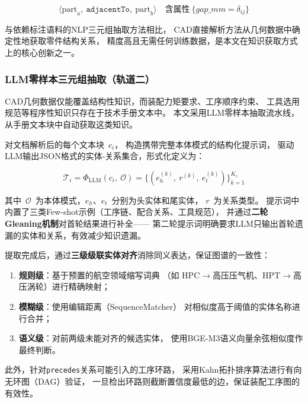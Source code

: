 \begin{equation}
  \langle \text{part}_a,\ \texttt{adjacentTo},\ \text{part}_b \rangle
  \quad \text{含属性}\ \{gap\_mm = \delta_{ij}\}
  \label{eq:adjacent}
\end{equation}

与依赖标注语料的NLP三元组抽取方法相比，
CAD直接解析方法从几何数据中确定性地获取零件结构关系，
精度高且无需任何训练数据，是本文在知识获取方式上的核心创新之一。

\subsubsection{LLM零样本三元组抽取（轨道二）}
\label{sec:llm-kg}

CAD几何数据仅能覆盖结构性知识，而装配力矩要求、工序顺序约束、
工具选用规范等程序性知识只存在于技术手册文本中。
本文采用LLM零样本抽取流水线，从手册文本块中自动获取这类知识。

对文档解析后的每个文本块~$c_i$，
构造携带完整本体模式的结构化提示词，
驱动LLM输出JSON格式的实体-关系集合，形式化定义为：

\begin{equation}
  \mathcal{T}_i = \Phi_{\text{LLM}}(c_i,\ \mathcal{O})
                = \bigl\{(e_h^{(k)},\ r^{(k)},\ e_t^{(k)})\bigr\}_{k=1}^{K_i}
  \label{eq:llm-extract}
\end{equation}

其中~$\mathcal{O}$~为本体模式，$e_h$、$e_t$~分别为头实体和尾实体，
$r$~为关系类型。
提示词中内置了三类Few-shot示例（工序链、配合关系、工具规范），
并通过\textbf{二轮Gleaning机制}对首轮结果进行补全——
第二轮提示词明确要求LLM只输出首轮遗漏的实体和关系，有效减少知识遗漏。

提取完成后，通过\textbf{三级级联实体对齐}消除同义表达，保证图谱的一致性：
\begin{enumerate}
  \item \textbf{规则级}：基于预置的航空领域缩写词典
        （如 HPC$\rightarrow$高压压气机、HPT$\rightarrow$高压涡轮）进行精确映射；
  \item \textbf{模糊级}：使用编辑距离（SequenceMatcher）
        对相似度高于阈值的实体名称进行合并；
  \item \textbf{语义级}：对前两级未能对齐的候选实体，
        使用BGE-M3语义向量余弦相似度作最终判断。
\end{enumerate}

此外，针对\texttt{precedes}关系可能引入的工序环路，
采用Kahn拓扑排序算法进行有向无环图（DAG）验证，
一旦检出环路则截断置信度最低的边，保证装配工序图的有效性。

